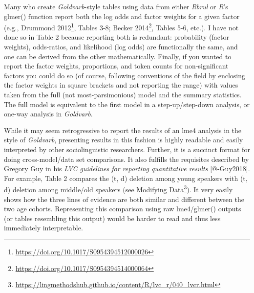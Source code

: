 \documentclass[
  10pt,
  letterpaper]{article}
\renewcommand\texttt[1]{{\ttfamily\color{BrickRed}#1}}
\DeclareRobustCommand{\href}[2]{#2\footnote{\url{#1}}}
\begin{document}
Many who create \emph{Goldvarb}-style tables using data from either
\emph{Rbrul} or \emph{R}'s \texttt{glmer()} function report both the log
odds and factor weights for a given factor (e.g.,
\href{https://doi.org/10.1017/S0954394512000026}{Drummond 2012}, Tables
3-8; \href{https://doi.org/10.1017/S0954394514000064}{Becker 2014},
Tables 5-6, etc.). I have not done so in Table 2 because reporting both
is redundant: probability (factor weights), odds-ratios, and likelihood
(log odds) are functionally the same, and one can be derived from the
other mathematically. Finally, if you wanted to report the factor
weights, proportions, and token counts for non-significant factors you
could do so (of course, following conventions of the field by enclosing
the factor weights in square brackets and not reporting the range) with
values taken from the full (not most-parsimonious) model and the summary
statistics. The full model is equivalent to the first model in a
step-up/step-down analysis, or one-way analysis in \emph{Goldvarb}.

While it may seem retrogressive to report the results of an
\texttt{lme4} analysis in the style of \emph{Goldvarb}, presenting
results in this fashion is highly readable and easily interpreted by
other sociolinguistic researchers. Further, it is a succinct format for
doing cross-model/data set comparisons. It also fulfills the requisites
described by Gregory Guy in his \emph{LVC guidelines for reporting
quantitative results} {[}@-Guy2018{]}. For example, Table 2 compares the
(t, d) deletion among young speakers with (t, d) deletion among
middle/old speakers (see
\href{https://lingmethodshub.github.io/content/R/lvc_r/040_lvcr.html}{Modifying
Data}). It very easily shows how the three lines of evidence are both
similar and different between the two age cohorts. Representing this
comparison using raw \texttt{lme4}/\texttt{glmer()} outputs (or tables
resembling this output) would be harder to read and thus less
immediately interpretable.
\end{document}
